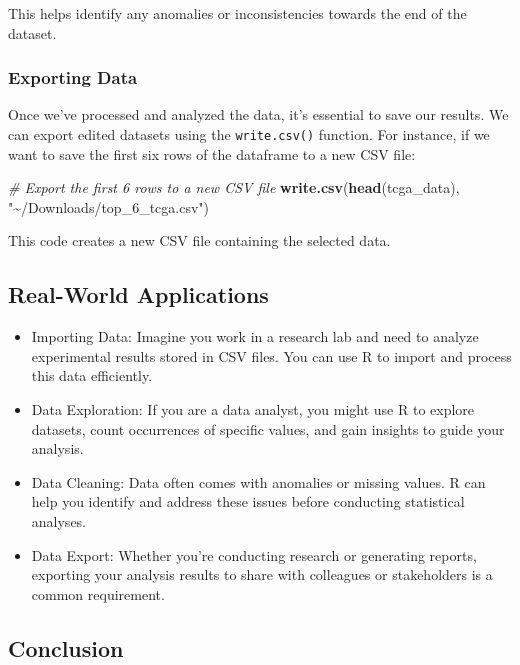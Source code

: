 \documentclass[
]{book}
\newenvironment{Shaded}{\begin{snugshade}}{\end{snugshade}}
\newcommand{\CommentTok}[1]{\textcolor[rgb]{0.56,0.35,0.01}{\textit{#1}}}
\newcommand{\FunctionTok}[1]{\textcolor[rgb]{0.13,0.29,0.53}{\textbf{#1}}}
\newcommand{\NormalTok}[1]{#1}
\newcommand{\StringTok}[1]{\textcolor[rgb]{0.31,0.60,0.02}{#1}}
\begin{document}
This helps identify any anomalies or inconsistencies towards the end of the dataset.

\hypertarget{exporting-data}{%
\subsubsection{Exporting Data}\label{exporting-data}}

Once we've processed and analyzed the data, it's essential to save our results. We can export edited datasets using the \texttt{write.csv()} function. For instance, if we want to save the first six rows of the dataframe to a new CSV file:

\begin{Shaded}
\begin{Highlighting}[]
\CommentTok{\# Export the first 6 rows to a new CSV file}
\FunctionTok{write.csv}\NormalTok{(}\FunctionTok{head}\NormalTok{(tcga\_data), }\StringTok{"\textasciitilde{}/Downloads/top\_6\_tcga.csv"}\NormalTok{)}
\end{Highlighting}
\end{Shaded}

This code creates a new CSV file containing the selected data.

\hypertarget{real-world-applications}{%
\subsection{Real-World Applications}\label{real-world-applications}}

\begin{itemize}
\item
  Importing Data: Imagine you work in a research lab and need to analyze experimental results stored in CSV files. You can use R to import and process this data efficiently.
\item
  Data Exploration: If you are a data analyst, you might use R to explore datasets, count occurrences of specific values, and gain insights to guide your analysis.
\item
  Data Cleaning: Data often comes with anomalies or missing values. R can help you identify and address these issues before conducting statistical analyses.
\item
  Data Export: Whether you're conducting research or generating reports, exporting your analysis results to share with colleagues or stakeholders is a common requirement.
\end{itemize}

\hypertarget{conclusion-13}{%
\subsection{Conclusion}\label{conclusion-13}}
\end{document}
